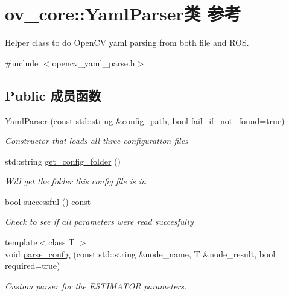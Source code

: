 \hypertarget{classov__core_1_1YamlParser}{}\section{ov\+\_\+core\+:\+:Yaml\+Parser类 参考}
\label{classov__core_1_1YamlParser}


Helper class to do Open\+CV yaml parsing from both file and R\+OS.  




{\ttfamily \#include $<$opencv\+\_\+yaml\+\_\+parse.\+h$>$}

\subsection*{Public 成员函数}
\begin{DoxyCompactItemize}
\item 
\hyperlink{classov__core_1_1YamlParser_a4f4acc860b546d60f422a07d60eaa99b}{Yaml\+Parser} (const std\+::string \&config\+\_\+path, bool fail\+\_\+if\+\_\+not\+\_\+found=true)
\begin{DoxyCompactList}\small\item\em Constructor that loads all three configuration files \end{DoxyCompactList}\item 
std\+::string \hyperlink{classov__core_1_1YamlParser_a76a8ca471859dd6fd22e1772c3d1aa44}{get\+\_\+config\+\_\+folder} ()
\begin{DoxyCompactList}\small\item\em Will get the folder this config file is in \end{DoxyCompactList}\item 
bool \hyperlink{classov__core_1_1YamlParser_a05ee1de4577cdd64ad91a3f11c372714}{successful} () const
\begin{DoxyCompactList}\small\item\em Check to see if all parameters were read succesfully \end{DoxyCompactList}\item 
{\footnotesize template$<$class T $>$ }\\void \hyperlink{classov__core_1_1YamlParser_aff9bc745ae8097ece9807ec4d0fbec2f}{parse\+\_\+config} (const std\+::string \&node\+\_\+name, T \&node\+\_\+result, bool required=true)
\begin{DoxyCompactList}\small\item\em Custom parser for the E\+S\+T\+I\+M\+A\+T\+OR parameters. \end{DoxyCompactList}\item 

\end{DoxyCompactItemize}
